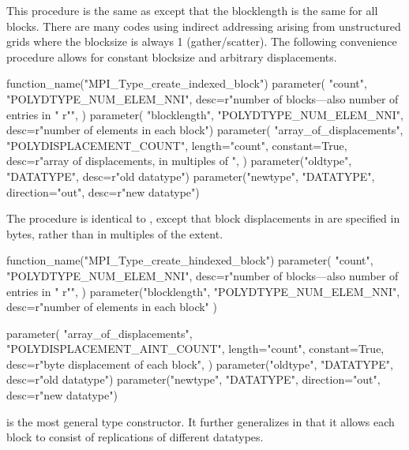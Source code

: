 This procedure is the same as  except that the
blocklength is the same for all blocks.
There are many codes using indirect addressing arising from
unstructured grids where the blocksize is always 1 (gather/scatter).  The
following convenience procedure allows for constant blocksize and arbitrary
displacements.


\begin{mpi-binding}
    function_name("MPI_Type_create_indexed_block")
    parameter(
        "count",
        "POLYDTYPE_NUM_ELEM_NNI",
        desc=r"number of blocks---also number of entries in "
            r"",
    )
    parameter(
         "blocklength", "POLYDTYPE_NUM_ELEM_NNI",
         desc=r"number of elements in each block")
    parameter(
        "array_of_displacements",
        "POLYDISPLACEMENT_COUNT",
        length="count",
        constant=True,
        desc=r"array of displacements, in multiples of ",
    )
    parameter("oldtype", "DATATYPE", desc=r"old datatype")
    parameter("newtype", "DATATYPE", direction="out", desc=r"new datatype")
\end{mpi-binding}

The procedure  is identical
to , except that block
displacements in  are specified in
bytes, rather than in multiples of the  extent.

\begin{mpi-binding}
    function_name("MPI_Type_create_hindexed_block")
    parameter(
        "count",
        "POLYDTYPE_NUM_ELEM_NNI",
        desc=r"number of blocks---also number of entries in "
            r"",
    )
    parameter("blocklength", "POLYDTYPE_NUM_ELEM_NNI",
        desc=r"number of elements in each block"
    )

    parameter(
        "array_of_displacements",
        "POLYDISPLACEMENT_AINT_COUNT",
        length="count",
        constant=True,
        desc=r"byte displacement of each block",
    )
    parameter("oldtype", "DATATYPE", desc=r"old datatype")
    parameter("newtype", "DATATYPE", direction="out", desc=r"new datatype")
\end{mpi-binding}

 is the most general type constructor.
It further generalizes
in that it allows each block to consist of replications of
different datatypes.

